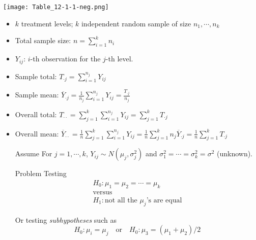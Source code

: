 \begin{frame}
	\centering
	\texttt{[image: Table\_12-1-1-neg.png]}
	\vfill
	\begin{itemize}
		\item $k$ treatment levels; $k$ independent random sample of size $n_1,\cdots, n_k$
			\vfill
		\item Total sample size: $n=\sum_{i=1}^k n_i$
			\vfill
		\item $Y_{ij}$: $i$-th observation for the $j$-th level.
			\vfill
		\item Sample total: $T_{\cdot j} = \sum_{i=1}^{n_j}Y_{i j}$
			\vfill
		\item Sample mean: $\overline{Y}_{\cdot j} = \frac{1}{n_j}\sum_{i=1}^{n_j}Y_{i j} = \frac{T_{\cdot j}}{n_j}$
			\vfill
		\item Overall total: $T_{\cdot \cdot} = \sum_{j=1}^k \sum_{i=1}^{n_j}Y_{i j}=\sum_{j=1}^k T_{\cdot j}$
			\vfill
		\item Overall mean: $\overline{Y}_{\cdot \cdot} =\frac{1}{n}\sum_{j=1}^k \sum_{i=1}^{n_j}Y_{i j} = \frac{1}{n}\sum_{j=1}^k n_j \overline{Y}_{\cdot j} = \frac{1}{n}\sum_{j=1}^k T_{\cdot j}$
	\end{itemize}
\end{frame}
\begin{frame}

	\begin{enumerate}
		\item[Assume] For $j=1,\cdots, k$, $Y_{ij}\sim N(\mu_j,\sigma_j^2)$ and $\sigma_1^2 = \cdots =\sigma_k^2 = \sigma^2$ (unknown).
			\vfill
		\item[Problem] Testing
			\begin{gather*}
				H_0 : \mu_1=\mu_2=\cdots = \mu_k\\
				      \text{versus}\\
				H_1: \text{not all the $\mu_j$'s are equal}
			\end{gather*}
			\vfill
		\item[] Or testing \textcolor{yellow!80!black}{\it subhypotheses} such as\\[2em]
			\[
				H_0 : \mu_i = \mu_j \quad\text{or}\quad
				H_0 : \mu_3 = (\mu_1+\mu_2)/2
			\]
	\end{enumerate}
\end{frame}
